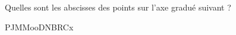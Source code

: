 
\begin{exercice}\label{exo2smath-0046}

    Quelles sont les abscisses des points sur l'axe gradué suivant ?

PJMMooDNBRCx

\end{exercice}

